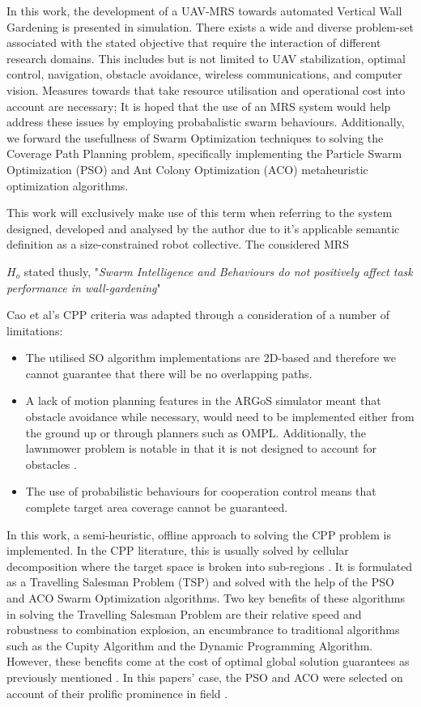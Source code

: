 \documentclass{report}
\begin{document}
In this work, the development of a UAV-MRS towards automated Vertical Wall Gardening is presented in simulation. There exists a wide and diverse problem-set associated with the stated objective that require the interaction of different research domains. This includes but is not limited to UAV stabilization, optimal control, navigation, obstacle avoidance, wireless communications, and computer vision. Measures towards that take resource utilisation and operational cost into account are necessary; It is hoped that the use of an MRS system would help address these issues by employing probabalistic swarm behaviours. Additionally, we forward the usefullness of Swarm Optimization techniques to solving the Coverage Path Planning problem, specifically implementing the Particle Swarm Optimization (PSO) \cite{Kennedy1995} and Ant Colony Optimization (ACO) \cite{Dorigo1997} metaheuristic optimization algorithms.

This work will exclusively make use of this term when referring to the system designed, developed and analysed by the author due to it's applicable semantic definition as a size-constrained robot collective. The considered MRS

 $H_o$ stated thusly, "\textit{Swarm Intelligence and Behaviours do not positively affect task performance in wall-gardening}"

Cao et al's \cite{Cao1988} CPP criteria was adapted through a consideration of a number of limitations:
\begin{itemize}
	\item The utilised SO algorithm implementations are 2D-based and therefore we cannot guarantee that there will be no overlapping paths.
	\item A lack of motion planning features in the ARGoS simulator meant that obstacle avoidance while necessary, would need to be implemented either from the ground up or through planners such as OMPL. Additionally, the lawnmower problem is notable in that it is not designed to account for obstacles \cite{Galceran2013}.
	\item The use of probabilistic behaviours for cooperation control means that complete target area coverage cannot be guaranteed.
\end{itemize}

In this work, a semi-heuristic, offline approach to solving the CPP problem is implemented. In the CPP literature, this is usually solved by cellular decomposition where the target space is broken into sub-regions \cite{Choset2001}. It is formulated as a Travelling Salesman Problem (TSP) and solved with the help of the PSO and ACO Swarm Optimization algorithms. Two key benefits of these algorithms in solving the Travelling Salesman Problem are their relative speed and robustness to combination explosion, an encumbrance to traditional algorithms such as the Cupity Algorithm and the Dynamic Programming Algorithm. However, these benefits come at the cost of optimal global solution guarantees as previously mentioned \cite{Yan2012}.
In this papers' case, the PSO and ACO were selected on account of their prolific prominence in field \cite{Selvi2010}.
\end{document}
